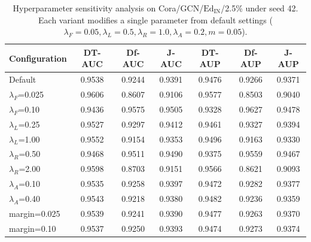 
\begin{table}

\centering

\caption{Hyperparameter sensitivity analysis on Cora/GCN/$\mathrm{Ed}_{\mathrm{IN}}$/2.5\% under seed 42. Each variant modifies a single parameter from default settings ($\lambda_F=0.05, \lambda_L=0.5, \lambda_R=1.0, \lambda_A=0.2, m=0.05$).}\label{tab:sensitivity}

\renewcommand{\arraystretch}{1.04}

\small

\setlength{\tabcolsep}{3.2pt}

\begin{tabular*}{\textwidth}{@{\extracolsep{\fill}}lcccccc}

\toprule

Configuration & DT-AUC & Df-AUC & J-AUC & DT-AUP & Df-AUP & J-AUP \\

\midrule

Default & 0.9538 & 0.9244 & 0.9391 & 0.9476 & 0.9266 & 0.9371 \\

$\lambda_F$=0.025 & 0.9606 & 0.8607 & 0.9106 & 0.9577 & 0.8503 & 0.9040 \\

$\lambda_F$=0.10 & 0.9436 & 0.9575 & 0.9505 & 0.9328 & 0.9627 & 0.9478 \\

$\lambda_L$=0.25 & 0.9527 & 0.9297 & 0.9412 & 0.9461 & 0.9327 & 0.9394 \\

$\lambda_L$=1.00 & 0.9552 & 0.9154 & 0.9353 & 0.9496 & 0.9163 & 0.9330 \\

$\lambda_R$=0.50 & 0.9468 & 0.9511 & 0.9490 & 0.9375 & 0.9559 & 0.9467 \\

$\lambda_R$=2.00 & 0.9598 & 0.8703 & 0.9151 & 0.9566 & 0.8621 & 0.9093 \\

$\lambda_A$=0.10 & 0.9535 & 0.9258 & 0.9397 & 0.9472 & 0.9282 & 0.9377 \\

$\lambda_A$=0.40 & 0.9543 & 0.9218 & 0.9380 & 0.9482 & 0.9236 & 0.9359 \\

margin=0.025 & 0.9539 & 0.9241 & 0.9390 & 0.9477 & 0.9263 & 0.9370 \\

margin=0.10 & 0.9537 & 0.9250 & 0.9393 & 0.9474 & 0.9273 & 0.9374 \\

\bottomrule

\end{tabular*}

\end{table}

